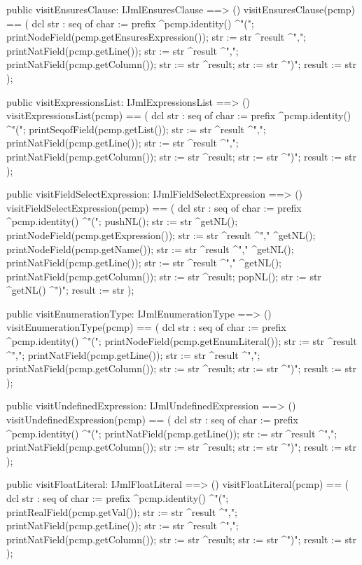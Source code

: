 \begin{vdm_al}
  public visitEnsuresClause: IJmlEnsuresClause ==> ()
  visitEnsuresClause(pcmp) ==
    ( dcl str : seq of char := prefix ^pcmp.identity() ^"(";
      printNodeField(pcmp.getEnsuresExpression());
      str := str ^result ^",";
      printNatField(pcmp.getLine());
      str := str ^result ^",";
      printNatField(pcmp.getColumn());
      str := str ^result;
      str := str ^")";
      result := str );

  public visitExpressionsList: IJmlExpressionsList ==> ()
  visitExpressionsList(pcmp) ==
    ( dcl str : seq of char := prefix ^pcmp.identity() ^"(";
      printSeqofField(pcmp.getList());
      str := str ^result ^",";
      printNatField(pcmp.getLine());
      str := str ^result ^",";
      printNatField(pcmp.getColumn());
      str := str ^result;
      str := str ^")";
      result := str );

  public visitFieldSelectExpression: IJmlFieldSelectExpression ==> ()
  visitFieldSelectExpression(pcmp) ==
    ( dcl str : seq of char := prefix ^pcmp.identity() ^"(";
      pushNL();
      str := str ^getNL();
      printNodeField(pcmp.getExpression());
      str := str ^result ^"," ^getNL();
      printNodeField(pcmp.getName());
      str := str ^result ^"," ^getNL();
      printNatField(pcmp.getLine());
      str := str ^result ^"," ^getNL();
      printNatField(pcmp.getColumn());
      str := str ^result;
      popNL();
      str := str ^getNL() ^")";
      result := str );

  public visitEnumerationType: IJmlEnumerationType ==> ()
  visitEnumerationType(pcmp) ==
    ( dcl str : seq of char := prefix ^pcmp.identity() ^"(";
      printNodeField(pcmp.getEnumLiteral());
      str := str ^result ^",";
      printNatField(pcmp.getLine());
      str := str ^result ^",";
      printNatField(pcmp.getColumn());
      str := str ^result;
      str := str ^")";
      result := str );

  public visitUndefinedExpression: IJmlUndefinedExpression ==> ()
  visitUndefinedExpression(pcmp) ==
    ( dcl str : seq of char := prefix ^pcmp.identity() ^"(";
      printNatField(pcmp.getLine());
      str := str ^result ^",";
      printNatField(pcmp.getColumn());
      str := str ^result;
      str := str ^")";
      result := str );

  public visitFloatLiteral: IJmlFloatLiteral ==> ()
  visitFloatLiteral(pcmp) ==
    ( dcl str : seq of char := prefix ^pcmp.identity() ^"(";
      printRealField(pcmp.getVal());
      str := str ^result ^",";
      printNatField(pcmp.getLine());
      str := str ^result ^",";
      printNatField(pcmp.getColumn());
      str := str ^result;
      str := str ^")";
      result := str );


\end{vdm_al}
